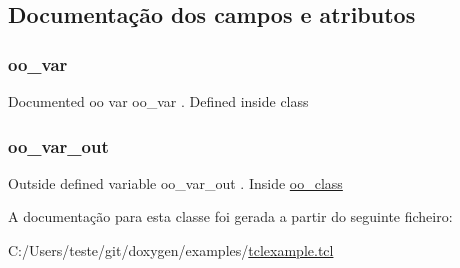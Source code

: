 \subsection{Documentação dos campos e atributos}
\hypertarget{classns_1_1oo__class_a0db9c0f77e13b0938595c27ae93fc47d}{
\subsubsection[{oo\-\_\-var}]{\setlength{\rightskip}{0pt plus 5cm}oo\-\_\-var\hspace{0.3cm}{\ttfamily [static]}}}\label{classns_1_1oo__class_a0db9c0f77e13b0938595c27ae93fc47d}
Documented oo var {\ttfamily oo\-\_\-var} . Defined inside class \hypertarget{classns_1_1oo__class_ab81ae08f4b693af6731d12ee2827971b}{
\subsubsection[{oo\-\_\-var\-\_\-out}]{\setlength{\rightskip}{0pt plus 5cm}oo\-\_\-var\-\_\-out\hspace{0.3cm}{\ttfamily [static]}}}\label{classns_1_1oo__class_ab81ae08f4b693af6731d12ee2827971b}
Outside defined variable {\ttfamily oo\-\_\-var\-\_\-out} . Inside \hyperlink{classns_1_1oo__class}{oo\-\_\-class} 

A documentação para esta classe foi gerada a partir do seguinte ficheiro\-:\begin{DoxyCompactItemize}
\item 
C\-:/\-Users/teste/git/doxygen/examples/\hyperlink{tclexample_8tcl}{tclexample.\-tcl}\end{DoxyCompactItemize}
